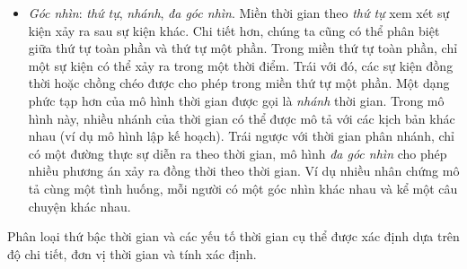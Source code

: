 \begin{itemize}
    \item \textit{Góc nhìn}: \textit{thứ tự}, \textit{nhánh}, \textit{đa góc nhìn}. Miền thời gian theo \textit{thứ tự} xem xét sự kiện xảy ra sau sự kiện khác. Chi tiết hơn, chúng ta cũng có thể phân biệt giữa thứ tự toàn phần và thứ tự một phần. Trong miền thứ tự toàn phần, chỉ một sự kiện có thể xảy ra trong một thời điểm. Trái với đó, các sự kiện đồng thời hoặc chồng chéo được cho phép trong miền thứ tự một phần. Một dạng phức tạp hơn của mô hình thời gian được gọi là \textit{nhánh} thời gian. Trong mô hình này, nhiều nhánh của thời gian có thể được mô tả với các kịch bản khác nhau (ví dụ mô hình lập kế hoạch). Trái ngược với thời gian phân nhánh, chỉ có một đường thực sự diễn ra theo thời gian, mô hình \textit{đa góc nhìn} cho phép nhiều phương án xảy ra đồng thời theo thời gian. Ví dụ nhiều nhân chứng mô tả cùng một tình huống, mỗi người có một góc nhìn khác nhau và kể một câu chuyện khác nhau.
\end{itemize}
Phân loại thứ bậc thời gian và các yếu tố thời gian cụ thể được xác định dựa trên độ chi tiết, đơn vị thời gian và tính xác định.
